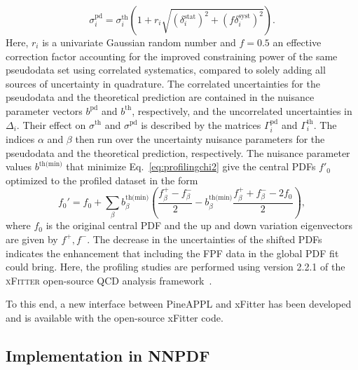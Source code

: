 \begin{equation}
\sigma_i^{\textrm{pd}}
=
\sigma_i^{\textrm{th}}
\left( 1 + r_i \sqrt{     (\delta_i^{\textrm{stat}})^2
                      + (f \delta_i^{\textrm{syst}})^2 }
\right).
\end{equation}
Here, $r_i$ is a univariate Gaussian random number and $f = 0.5$ an effective correction factor 
accounting for the improved constraining power of the same pseudodata set using correlated systematics, compared to solely adding all sources of uncertainty in quadrature.
%
The correlated uncertainties for the pseudodata and the theoretical prediction 
are contained in the nuisance parameter vectors $b^{\textrm{pd}}$ and $b^{\textrm{th}}$, respectively, and the uncorrelated uncertainties in $\Delta_i$.
%
Their effect on $\sigma^{\textrm{th}}$ and $\sigma^{\textrm{pd}}$
is described by the matrices $\Gamma_i^{\textrm{pd}}$ and $\Gamma_i^{\textrm{th}}$.
The indices $\alpha$ and $\beta$ then run over the uncertainty nuisance parameters for the pseudodata and the theoretical prediction, respectively.
%
The nuisance parameter values $b^{\textrm{th(min)}}$ that minimize Eq.~\eqref{eq:profilingchi2} give the central PDFs $f'_0$ optimized to the profiled dataset in the form
\begin{equation}
f_0' = f_0
      + \sum_\beta b_\beta^{\textrm{th(min)}} 
        \left(  \frac{f_\beta^+   -  f_\beta^- }{2}
              -    b_\beta^{\textrm{th(min)}}
                \frac{f_\beta^+ + f_\beta^- - 2f_0}{2}
        \right),
\end{equation}
where $f_0$ is the original central PDF and the up and down variation eigenvectors are given by $f^+, f^-$. The decrease in the uncertainties of the shifted PDFs indicates the enhancement that including the FPF data in the global PDF fit could bring. Here, the profiling studies are performed using version 2.2.1 of the \textsc{xFitter} open-source QCD analysis framework~\cite{Alekhin:2014irh, Bertone:2017tig, xFitter:2022zjb, xFitter:web}.
%

To this end, a new interface between  {\sc\small PineAPPL} and {\sc\small xFitter} has been developed and is available with the open-source {\sc\small xFitter} code.

\subsection{Implementation in NNPDF}



